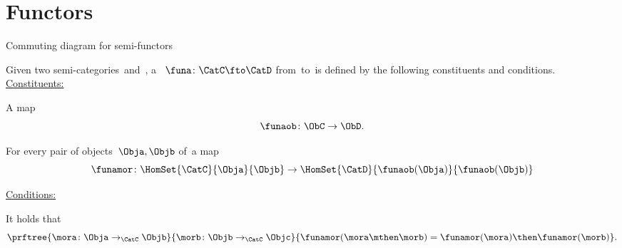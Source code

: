 

\section{Functors}

\begin{marginfigure}
    \centering
    \caption{Commuting diagram for semi-functors}
    \label{fig:functor_detail}
\end{marginfigure}


\begin{ctdefinition}
    \label{def:semi-functor}
    Given two semi-categories~\CatC and~\CatD, a \emph{}~$\funa\colon \CatC\fto \CatD$ from~\CatC to~\CatD is defined by the following constituents and conditions. \\
    \underline{Constituents:}
    \begin{compactenum}
        [i)]
        \item A map
        \begin{equation}
            \funaob\colon \ObC \to \ObD.
        \end{equation}
        \item For every pair of objects~$\Obja, \Objb$ of~\CatC a map
        \begin{equation}
            \funamor\colon \HomSet{\CatC}{\Obja}{\Objb} \to \HomSet{\CatD}{\funaob(\Obja)}{\funaob(\Objb)}
        \end{equation}
    \end{compactenum}
    \underline{Conditions:}
    \begin{compactenum}
        \item It holds that
        \begin{equation}
            \prftree{\mora\colon \Obja \to_{\CatC} \Objb}{\morb\colon \Objb \to_{\CatC} \Objc}{
                \funamor(\mora \mthen \morb)=\funamor(\mora)\then \funamor(\morb)
            }.
        \end{equation}
    \end{compactenum}
\end{ctdefinition}

